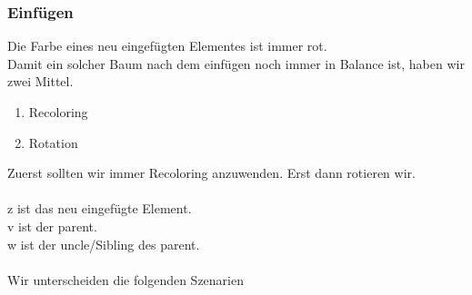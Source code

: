 \documentclass[a4paper,10pt]{report}
\begin{document}
\subsubsection{Einfügen}
Die Farbe eines neu eingefügten Elementes ist immer rot.\\
Damit ein solcher Baum nach dem einfügen noch immer in Balance ist, haben wir zwei Mittel.
\begin{enumerate}
	\item
		Recoloring
	\item
		Rotation
\end{enumerate}
Zuerst sollten wir immer Recoloring anzuwenden. Erst dann rotieren wir.\\
\\
z ist das neu eingefügte Element.\\
v ist der parent.\\
w ist der uncle/Sibling des parent. \\
\\
Wir unterscheiden die folgenden Szenarien
\end{document}

